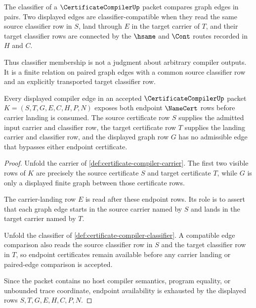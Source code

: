 \begin{definition}
\label{def:certificate-compiler-classifier}
The classifier of a $\CertificateCompilerUp$ packet compares graph edges in
pairs. Two displayed edges are classifier-compatible when they read the same
source classifier row in $S$, land through $E$ in the target carrier of $T$,
and their target classifier rows are connected by the $\hsame$ and $\Cont$
routes recorded in $H$ and $C$.

Thus classifier membership is not a judgment about arbitrary compiler
outputs. It is a finite relation on paired graph edges with a common source
classifier row and an explicitly transported target classifier row.
\end{definition}

\begin{theorem}
\label{thm:certificate-compiler-endpoint-certificate-availability}
Every displayed compiler edge in an accepted $\CertificateCompilerUp$ packet $K=(S,T,G,E,C,H,P,N)$ exposes both endpoint $\NameCert$ rows before carrier landing is consumed. The source certificate row $S$ supplies the admitted input carrier and classifier row, the target certificate row $T$ supplies the landing carrier and classifier row, and the displayed graph row $G$ has no admissible edge that bypasses either endpoint certificate.
\end{theorem}
\begin{proof}
Unfold the carrier of \autoref{def:certificate-compiler-carrier}. The first two visible rows of $K$ are precisely the source certificate $S$ and target certificate $T$, while $G$ is only a displayed finite graph between those certificate rows.

The carrier-landing row $E$ is read after these endpoint rows. Its role is to assert that each graph edge starts in the source carrier named by $S$ and lands in the target carrier named by $T$.

Unfold the classifier of \autoref{def:certificate-compiler-classifier}. A compatible edge comparison also reads the source classifier row in $S$ and the target classifier row in $T$, so endpoint certificates remain available before any carrier landing or paired-edge comparison is accepted.

Since the packet contains no host compiler semantics, program equality, or unbounded trace coordinate, endpoint availability is exhausted by the displayed rows $S,T,G,E,H,C,P,N$.
\end{proof}

